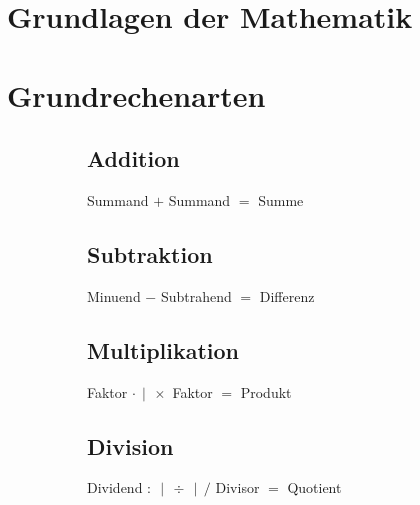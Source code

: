 \documentclass[11pt,a4paper,oneside]{article}
\author{\AUTHOR}
\title{\MYTITLE}
\begin{document}
\maketitle
\tableofcontents
\newpage
\section*{Grundlagen der Mathematik}
\section{Grundrechenarten}
\begin{figure}[h]
	\begin{subfigure}[t]{0.5\linewidth}
\subsection{Addition}
Summand $+$ Summand $=$ Summe
\subsection{Subtraktion}
Minuend $-$ Subtrahend $=$ Differenz
	\end{subfigure}%
	\begin{subfigure}[t]{0.5\linewidth}
\subsection{Multiplikation}
Faktor $\cdot\,\mid\,\times$ Faktor $=$ Produkt
\subsection{Division}
Dividend\: $:\:\mid\,\div\,\mid\,/$ Divisor $=$ Quotient
	\end{subfigure}
\end{figure}
\vspace{-1em}
\end{document}
